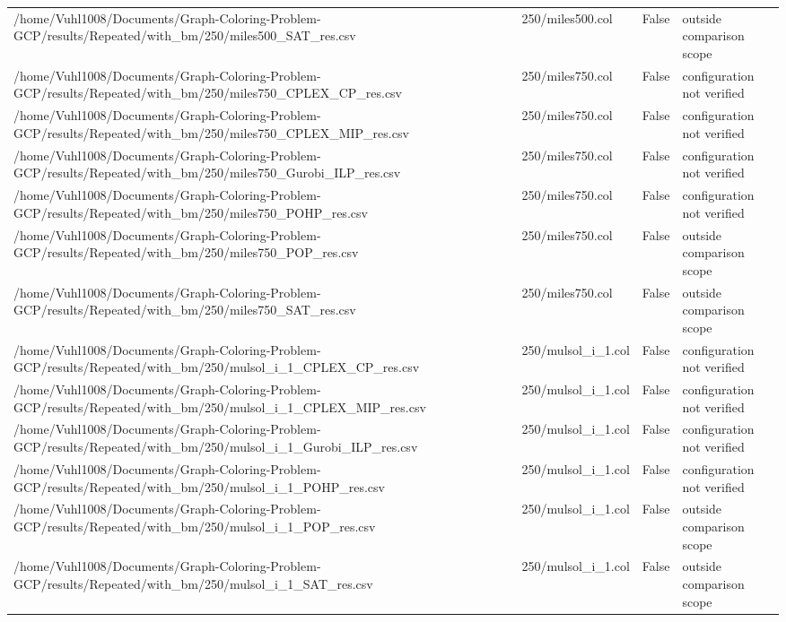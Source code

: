 \begin{table}[htbp]
\begin{tabular}{llll}
/home/Vuhl1008/Documents/Graph-Coloring-Problem-GCP/results/Repeated/with\_bm/250/miles500\_SAT\_res.csv & 250/miles500.col & False & outside comparison scope \\
/home/Vuhl1008/Documents/Graph-Coloring-Problem-GCP/results/Repeated/with\_bm/250/miles750\_CPLEX\_CP\_res.csv & 250/miles750.col & False & configuration not verified \\
/home/Vuhl1008/Documents/Graph-Coloring-Problem-GCP/results/Repeated/with\_bm/250/miles750\_CPLEX\_MIP\_res.csv & 250/miles750.col & False & configuration not verified \\
/home/Vuhl1008/Documents/Graph-Coloring-Problem-GCP/results/Repeated/with\_bm/250/miles750\_Gurobi\_ILP\_res.csv & 250/miles750.col & False & configuration not verified \\
/home/Vuhl1008/Documents/Graph-Coloring-Problem-GCP/results/Repeated/with\_bm/250/miles750\_POHP\_res.csv & 250/miles750.col & False & configuration not verified \\
/home/Vuhl1008/Documents/Graph-Coloring-Problem-GCP/results/Repeated/with\_bm/250/miles750\_POP\_res.csv & 250/miles750.col & False & outside comparison scope \\
/home/Vuhl1008/Documents/Graph-Coloring-Problem-GCP/results/Repeated/with\_bm/250/miles750\_SAT\_res.csv & 250/miles750.col & False & outside comparison scope \\
/home/Vuhl1008/Documents/Graph-Coloring-Problem-GCP/results/Repeated/with\_bm/250/mulsol\_i\_1\_CPLEX\_CP\_res.csv & 250/mulsol\_i\_1.col & False & configuration not verified \\
/home/Vuhl1008/Documents/Graph-Coloring-Problem-GCP/results/Repeated/with\_bm/250/mulsol\_i\_1\_CPLEX\_MIP\_res.csv & 250/mulsol\_i\_1.col & False & configuration not verified \\
/home/Vuhl1008/Documents/Graph-Coloring-Problem-GCP/results/Repeated/with\_bm/250/mulsol\_i\_1\_Gurobi\_ILP\_res.csv & 250/mulsol\_i\_1.col & False & configuration not verified \\
/home/Vuhl1008/Documents/Graph-Coloring-Problem-GCP/results/Repeated/with\_bm/250/mulsol\_i\_1\_POHP\_res.csv & 250/mulsol\_i\_1.col & False & configuration not verified \\
/home/Vuhl1008/Documents/Graph-Coloring-Problem-GCP/results/Repeated/with\_bm/250/mulsol\_i\_1\_POP\_res.csv & 250/mulsol\_i\_1.col & False & outside comparison scope \\
/home/Vuhl1008/Documents/Graph-Coloring-Problem-GCP/results/Repeated/with\_bm/250/mulsol\_i\_1\_SAT\_res.csv & 250/mulsol\_i\_1.col & False & outside comparison scope \\

\end{tabular}
\end{table}
